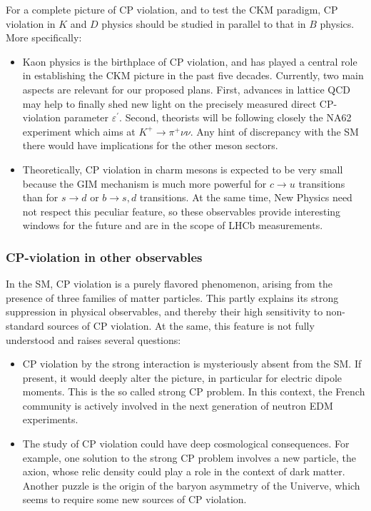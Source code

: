 \documentclass[a4paper,12pt]{article}%
\begin{document}
For a complete picture of CP violation, and to test the CKM paradigm, CP
violation in $K$ and $D$ physics should be studied in parallel to that in $B$
physics. More specifically:

\begin{itemize}
\item Kaon physics is the birthplace of CP violation, and has played a central
role in establishing the CKM picture in the past five decades. Currently, two
main aspects are relevant for our proposed plans. First, advances in lattice
QCD may help to finally shed new light on the precisely measured direct
CP-violation parameter $\varepsilon^{\prime}$. Second, theorists will be
following closely the NA62 experiment which aims at $K^{+}\rightarrow\pi
^{+}\nu\nu$. Any hint of discrepancy with the SM there would have implications
for the other meson sectors.

\item Theoretically, CP violation in charm mesons is expected to be very small
because the GIM mechanism is much more powerful for $c\rightarrow u$
transitions than for $s\rightarrow d$ or $b\rightarrow s,d$ transitions. At
the same time, New Physics need not respect this peculiar feature, so these
observables provide interesting windows for the future and are in the scope of
LHCb measurements.
\end{itemize}

\subsubsection*{CP-violation in other observables}

In the SM, CP violation is a purely flavored phenomenon, arising from the
presence of three families of matter particles. This partly explains its
strong suppression in physical observables, and thereby their high sensitivity
to non-standard sources of CP violation. At the same, this feature is not
fully understood and raises several questions:

\begin{itemize}
\item CP violation by the strong interaction is mysteriously absent from the
SM. If present, it would deeply alter the picture, in particular for electric
dipole moments. This is the so called strong CP problem. In this context, the
French community is actively involved in the next generation of neutron EDM experiments.

\item The study of CP violation could have deep cosmological consequences. For
example, one solution to the strong CP problem involves a new particle, the
axion, whose relic density could play a role in the context of dark matter.
Another puzzle is the origin of the baryon asymmetry of the Univerve, which
seems to require some new sources of CP violation.
\end{itemize}
\end{document}
